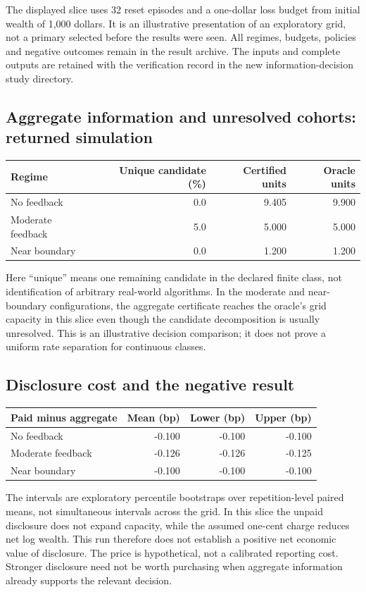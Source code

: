The displayed slice uses 32 reset episodes and a one-dollar loss budget from
initial wealth of 1,000 dollars. It is an illustrative presentation of an
exploratory grid, not a primary selected before the results were seen. All
regimes, budgets, policies and negative outcomes remain in the result archive.
The inputs and complete outputs are retained with the verification record in
the new information-decision study directory.

\subsection*{Aggregate information and unresolved cohorts: returned simulation}
\begin{center}\small
\begin{tabular}{lrrr}
\toprule
Regime & Unique candidate (\%) & Certified units & Oracle units\\
\midrule
No feedback & 0.0 & 9.405 & 9.900\\
Moderate feedback & 5.0 & 5.000 & 5.000\\
Near boundary & 0.0 & 1.200 & 1.200\\
\bottomrule
\end{tabular}
\end{center}
Here ``unique'' means one remaining candidate in the declared finite class,
not identification of arbitrary real-world algorithms. In the moderate and
near-boundary configurations, the aggregate certificate reaches the oracle's
grid capacity in this slice even though the candidate decomposition is usually
unresolved. This is an illustrative decision comparison; it does not prove a
uniform rate separation for continuous classes.

\subsection*{Disclosure cost and the negative result}
\begin{center}\small
\begin{tabular}{lrrr}
\toprule
Paid minus aggregate & Mean (bp) & Lower (bp) & Upper (bp)\\
\midrule
No feedback & -0.100 & -0.100 & -0.100\\
Moderate feedback & -0.126 & -0.126 & -0.125\\
Near boundary & -0.100 & -0.100 & -0.100\\
\bottomrule
\end{tabular}
\end{center}
The intervals are exploratory percentile bootstraps over repetition-level
paired means, not simultaneous intervals across the grid. In this slice the
unpaid disclosure does not expand capacity, while the assumed one-cent charge
reduces net log wealth. This run therefore does not establish a positive net
economic value of disclosure. The price is hypothetical, not a calibrated
reporting cost. Stronger disclosure need not be worth purchasing when aggregate
information already supports the relevant decision.

